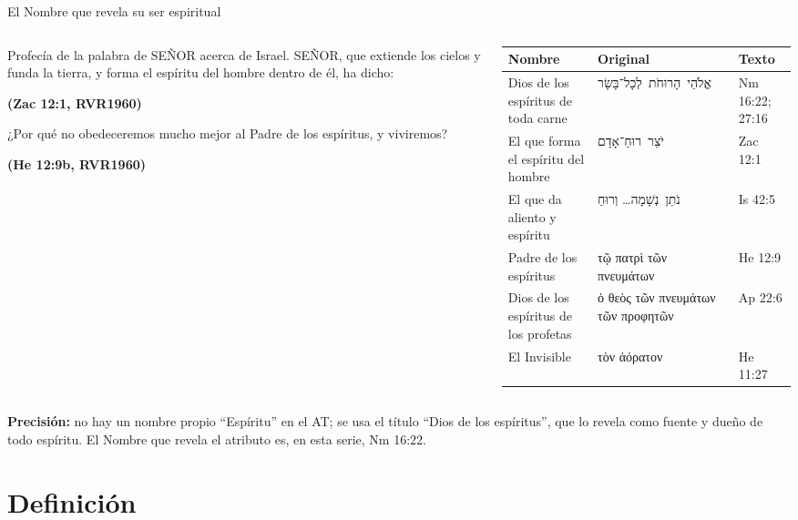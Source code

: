 \documentclass[hyperref={bookmarks=false},aspectratio=169]{beamer}
\newcommand{\heb}[1]{\mbox{\foreignlanguage{hebrew}{#1}}}
\newcommand{\grc}[1]{\foreignlanguage{ancientgreek}{#1}}
\newcommand{\SENOR}{S{\fontsize{0.78em}{1em}\selectfont EÑOR}}
\newcommand{\fuente}[1]{\par\hfill{\upshape\bfseries\footnotesize\textcolor{azul}{#1}}}
\newcommand{\precision}[1]{{\footnotesize\color{gris}\textbf{Precisión:} #1}}
\begin{document}
\begin{frame}{El Nombre que revela su ser espiritual}
\begin{columns}[c,onlytextwidth]
\begin{column}{0.44\textwidth}
\begin{cita}Profecía de la palabra de \SENOR{} acerca de Israel. \SENOR, que extiende los cielos y funda la tierra, y forma el espíritu del hombre dentro de él, ha dicho:\fuente{(Zac 12:1, RVR1960)}\end{cita}
\begin{cita}[fontupper=\scriptsize\itshape]¿Por qué no obedeceremos mucho mejor al Padre de los espíritus, y viviremos?\fuente{(He 12:9b, RVR1960)}\end{cita}
\end{column}
\begin{column}{0.54\textwidth}\scriptsize
\renewcommand{\arraystretch}{1.12}
\begin{tabular}{@{}>{\RaggedRight\arraybackslash}p{2.4cm}>{\RaggedRight\arraybackslash}p{2.5cm}>{\RaggedRight\arraybackslash}p{1.5cm}@{}}
\toprule
\textbf{Nombre} & \textbf{Original} & \textbf{Texto} \\ \midrule
Dios de los espíritus de toda carne & \heb{אֱלֹהֵי הָרוּחֹת לְכָל־בָּשָׂר} & Nm 16:22; 27:16 \\
El que forma el espíritu del hombre & \heb{יֹצֵר רוּחַ־אָדָם} & Zac 12:1 \\
El que da aliento y espíritu & \heb{נֹתֵן נְשָׁמָה}\ldots{} \heb{וְרוּחַ} & Is 42:5 \\
Padre de los espíritus & \grc{τῷ πατρὶ τῶν πνευμάτων} & He 12:9 \\
Dios de los espíritus de los profetas & \grc{ὁ θεὸς τῶν πνευμάτων τῶν προφητῶν} & Ap 22:6 \\
El Invisible & \grc{τὸν ἀόρατον} & He 11:27 \\
\bottomrule
\end{tabular}
\end{column}
\end{columns}\par\smallskip
\precision{no hay un nombre propio ``Espíritu'' en el AT; se usa el título ``Dios de los espíritus'', que lo revela como fuente y dueño de todo espíritu. El Nombre que revela el atributo es, en esta serie, Nm 16:22.}
\end{frame}

\section{Definición}
\end{document}
